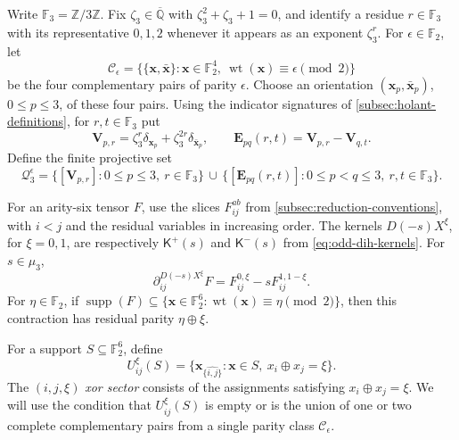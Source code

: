 \documentclass[11pt,letterpaper,onecolumn]{article}
\theoremstyle{plain}
\theoremstyle{definition}
\theoremstyle{remark}
\newcommand{\AlgNums}{\overline{\mathbb Q}}
\newcommand{\Ftwo}{\mathbb F_2}
\newcommand{\wt}{\operatorname{wt}}
\newcommand{\supp}{\operatorname{supp}}
\begin{document}
	Write \(\mathbb F_3=\mathbb Z/3\mathbb Z\).
	Fix \(\zeta_3\in\AlgNums\) with \(\zeta_3^2+\zeta_3+1=0\), and identify a
	residue \(r\in\mathbb F_3\) with its representative \(0,1,2\) whenever it
	appears as an exponent \(\zeta_3^r\).  For
	\(\epsilon\in\Ftwo\), let
	\[
	\mathcal C_\epsilon
	=
	\bigl\{\{{\mathbf x},\bar {\mathbf x}\}:{\mathbf x}\in\Ftwo^4,\
	\wt({\mathbf x})\equiv\epsilon\pmod2\bigr\}
	\]
	be the four complementary pairs of parity \(\epsilon\).  Choose an orientation
	\(({\mathbf x}_p,\bar {\mathbf x}_p)\), \(0\le p\le3\), of these four pairs. Using the indicator signatures of
\cref{subsec:holant-definitions}, for \(r,t\in\mathbb F_3\) put
	\begin{equation}
		{\mathbf V}_{p,r}=\zeta_3^r \delta_{{\mathbf x}_p}+\zeta_3^{2r}\delta_{\bar {\mathbf x}_p},
		\qquad
		{\mathbf E}_{pq}(r,t)={\mathbf V}_{p,r}-{\mathbf V}_{q,t}.
		\label{eq:cert-odd-dih-q4-atlas-vectors}
	\end{equation}
	Define the finite projective set
	\begin{equation*}
		\mathcal Q_3^\epsilon
		=
		\{[{\mathbf V}_{p,r}]:0\le p\le3,\ r\in\mathbb F_3\}
		\,\cup\,
		\{[{\mathbf E}_{pq}(r,t)]:0\le p<q\le3,\ r,t\in\mathbb F_3\}.
	\end{equation*}
	
For an arity-six tensor \(F\), use the slices \(F_{ij}^{ab}\) from
\cref{subsec:reduction-conventions}, with \(i<j\) and the residual variables
in increasing order. The kernels \(D(-s)X^\xi\), for \(\xi=0,1\), are
respectively \(\mathsf K^+(s)\) and \(\mathsf K^-(s)\) from
\cref{eq:odd-dih-kernels}. For \(s\in\mu_3\),
	\begin{equation}
		\partial_{ij}^{D(-s)X^\xi}F
		=
		F_{ij}^{0,\xi}-sF_{ij}^{1,1-\xi}.
		\label{eq:cert-odd-dih-q6-card}
	\end{equation}
	For \(\eta\in\Ftwo\), if
	\(\supp(F)\subseteq\{{\mathbf x}\in\Ftwo^6:\wt({\mathbf x})\equiv\eta\pmod2\}\), then this
	contraction has residual parity \(\eta\oplus\xi\).
	
	For a support \(S\subseteq\Ftwo^6\), define
	\begin{equation*}
		U_{ij}^{\xi}(S)
		=
		\{{\mathbf x}_{\widehat{\{i,j\}}}:{\mathbf x}\in S,\ x_i\oplus x_j=\xi\}.
	\end{equation*}
	The \((i,j,\xi)\) \emph{xor sector} consists of the assignments satisfying
	\(x_i\oplus x_j=\xi\).
	We will use the condition that \(U_{ij}^{\xi}(S)\) is empty or is the
	union of one or two complete complementary pairs from a single parity class
	\(\mathcal C_\epsilon\).
\end{document}
